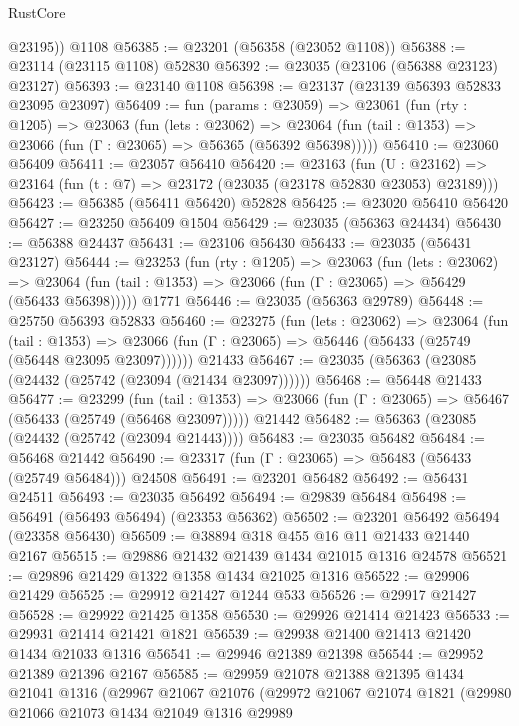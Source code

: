 \begin{lexlean}{RustCore}
\begin{coremodule}
        @23195))
    @1108
@56385 := @23201 (@56358 (@23052 @1108))
@56388 := @23114 (@23115 @1108) @52830
@56392 := @23035 (@23106 (@56388 @23123) @23127)
@56393 := @23140 @1108
@56398 := @23137 (@23139 @56393 @52833 @23095 @23097)
@56409 := fun (params : @23059) =>
  @23061
    (fun (rty : @1205) =>
    @23063
      (fun (lets : @23062) =>
      @23064 (fun (tail : @1353) => @23066 (fun (Γ : @23065) => @56365 (@56392 @56398)))))
@56410 := @23060 @56409
@56411 := @23057 @56410
@56420 := @23163
    (fun (U : @23162) => @23164 (fun (t : @7) => @23172 (@23035 (@23178 @52830 @23053) @23189)))
@56423 := @56385 (@56411 @56420) @52828
@56425 := @23020 @56410 @56420
@56427 := @23250 @56409 @1504
@56429 := @23035 (@56363 @24434)
@56430 := @56388 @24437
@56431 := @23106 @56430
@56433 := @23035 (@56431 @23127)
@56444 := @23253
    (fun (rty : @1205) =>
    @23063
      (fun (lets : @23062) =>
      @23064 (fun (tail : @1353) => @23066 (fun (Γ : @23065) => @56429 (@56433 @56398)))))
    @1771
@56446 := @23035 (@56363 @29789)
@56448 := @25750 @56393 @52833
@56460 := @23275
    (fun (lets : @23062) =>
    @23064
      (fun (tail : @1353) =>
      @23066 (fun (Γ : @23065) => @56446 (@56433 (@25749 (@56448 @23095 @23097))))))
    @21433
@56467 := @23035 (@56363 (@23085 (@24432 (@25742 (@23094 (@21434 @23097))))))
@56468 := @56448 @21433
@56477 := @23299
    (fun (tail : @1353) => @23066 (fun (Γ : @23065) => @56467 (@56433 (@25749 (@56468 @23097)))))
    @21442
@56482 := @56363 (@23085 (@24432 (@25742 (@23094 @21443))))
@56483 := @23035 @56482
@56484 := @56468 @21442
@56490 := @23317 (fun (Γ : @23065) => @56483 (@56433 (@25749 @56484))) @24508
@56491 := @23201 @56482
@56492 := @56431 @24511
@56493 := @23035 @56492
@56494 := @29839 @56484
@56498 := @56491 (@56493 @56494) (@23353 @56362)
@56502 := @23201 @56492 @56494 (@23358 @56430)
@56509 := @38894 @318 @455 @16 @11 @21433 @21440 @2167
@56515 := @29886 @21432 @21439 @1434 @21015 @1316 @24578
@56521 := @29896 @21429 @1322 @1358 @1434 @21025 @1316
@56522 := @29906 @21429
@56525 := @29912 @21427 @1244 @533
@56526 := @29917 @21427
@56528 := @29922 @21425 @1358
@56530 := @29926 @21414 @21423
@56533 := @29931 @21414 @21421 @1821
@56539 := @29938 @21400 @21413 @21420 @1434 @21033 @1316
@56541 := @29946 @21389 @21398
@56544 := @29952 @21389 @21396 @2167
@56585 := @29959
    @21078
    @21388
    @21395
    @1434
    @21041
    @1316
    (@29967
      @21067
      @21076
      (@29972
        @21067
        @21074
        @1821
        (@29980
          @21066
          @21073
          @1434
          @21049
          @1316
          @29989

\end{coremodule}
\end{lexlean}
